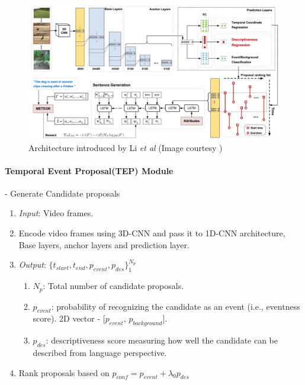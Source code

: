 \begin{figure}[h]
	\includegraphics[width=\linewidth]{assets/img/li2018jointly-architecture.png}
	\caption{Architecture introduced by Li \textit{et al} (Image courtesy \cite{li2018jointly})}
\end{figure}

\paragraph{Temporal Event Proposal(TEP) Module} - Generate Candidate proposals
\begin{enumerate}
	\item \textit{Input}: Video frames.
	\item Encode video frames using 3D-CNN and pass it to 1D-CNN architecture, Base layers, anchor layers and prediction layer.
	\item \textit{Output}: $\{t_{start}, t_{end}, p_{event}, p_{des}\}_1^{N_p}$
	\begin{enumerate}
		\item $N_p$: Total number of candidate proposals.
		\item $p_{event}$: probability of recognizing the candidate as an event (i.e., eventness score). 2D vector - [$p_{event}$, $p_{background}$].
		\item $p_{des}$: descriptiveness score measuring how well the candidate can be described from language perspective.
	\end{enumerate}
	\item Rank proposals based on $p_{conf} = p_{event} + \lambda_0p_{des}$
\end{enumerate}


